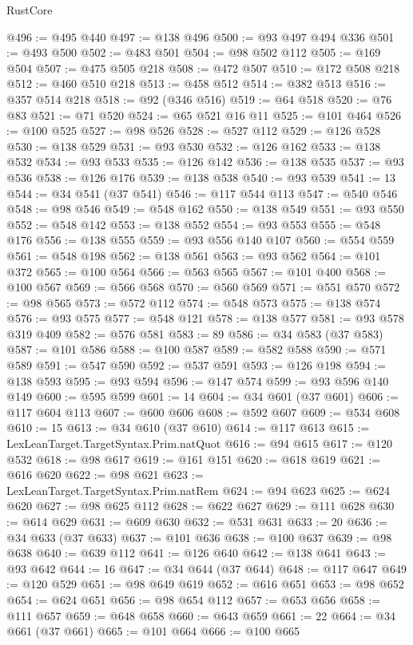 \begin{lexlean}{RustCore}
\begin{coremodule}
@496 := @495 @440
@497 := @138 @496
@500 := @93 @497 @494 @336
@501 := @493 @500
@502 := @483 @501
@504 := @98 @502 @112
@505 := @169 @504
@507 := @475 @505 @218
@508 := @472 @507
@510 := @172 @508 @218
@512 := @460 @510 @218
@513 := @458 @512
@514 := @382 @513
@516 := @357 @514 @218
@518 := @92 (@346 @516)
@519 := @64 @518
@520 := @76 @83
@521 := @71 @520
@524 := @65 @521 @16 @11
@525 := @101 @464
@526 := @100 @525
@527 := @98 @526
@528 := @527 @112
@529 := @126 @528
@530 := @138 @529
@531 := @93 @530
@532 := @126 @162
@533 := @138 @532
@534 := @93 @533
@535 := @126 @142
@536 := @138 @535
@537 := @93 @536
@538 := @126 @176
@539 := @138 @538
@540 := @93 @539
@541 := 13
@544 := @34 @541 (@37 @541)
@546 := @117 @544 @113
@547 := @540 @546
@548 := @98 @546
@549 := @548 @162
@550 := @138 @549
@551 := @93 @550
@552 := @548 @142
@553 := @138 @552
@554 := @93 @553
@555 := @548 @176
@556 := @138 @555
@559 := @93 @556 @140 @107
@560 := @554 @559
@561 := @548 @198
@562 := @138 @561
@563 := @93 @562
@564 := @101 @372
@565 := @100 @564
@566 := @563 @565
@567 := @101 @400
@568 := @100 @567
@569 := @566 @568
@570 := @560 @569
@571 := @551 @570
@572 := @98 @565
@573 := @572 @112
@574 := @548 @573
@575 := @138 @574
@576 := @93 @575
@577 := @548 @121
@578 := @138 @577
@581 := @93 @578 @319 @409
@582 := @576 @581
@583 := 89
@586 := @34 @583 (@37 @583)
@587 := @101 @586
@588 := @100 @587
@589 := @582 @588
@590 := @571 @589
@591 := @547 @590
@592 := @537 @591
@593 := @126 @198
@594 := @138 @593
@595 := @93 @594
@596 := @147 @574
@599 := @93 @596 @140 @149
@600 := @595 @599
@601 := 14
@604 := @34 @601 (@37 @601)
@606 := @117 @604 @113
@607 := @600 @606
@608 := @592 @607
@609 := @534 @608
@610 := 15
@613 := @34 @610 (@37 @610)
@614 := @117 @613
@615 := LexLeanTarget.TargetSyntax.Prim.natQuot
@616 := @94 @615
@617 := @120 @532
@618 := @98 @617
@619 := @161 @151
@620 := @618 @619
@621 := @616 @620
@622 := @98 @621
@623 := LexLeanTarget.TargetSyntax.Prim.natRem
@624 := @94 @623
@625 := @624 @620
@627 := @98 @625 @112
@628 := @622 @627
@629 := @111 @628
@630 := @614 @629
@631 := @609 @630
@632 := @531 @631
@633 := 20
@636 := @34 @633 (@37 @633)
@637 := @101 @636
@638 := @100 @637
@639 := @98 @638
@640 := @639 @112
@641 := @126 @640
@642 := @138 @641
@643 := @93 @642
@644 := 16
@647 := @34 @644 (@37 @644)
@648 := @117 @647
@649 := @120 @529
@651 := @98 @649 @619
@652 := @616 @651
@653 := @98 @652
@654 := @624 @651
@656 := @98 @654 @112
@657 := @653 @656
@658 := @111 @657
@659 := @648 @658
@660 := @643 @659
@661 := 22
@664 := @34 @661 (@37 @661)
@665 := @101 @664
@666 := @100 @665

\end{coremodule}
\end{lexlean}
